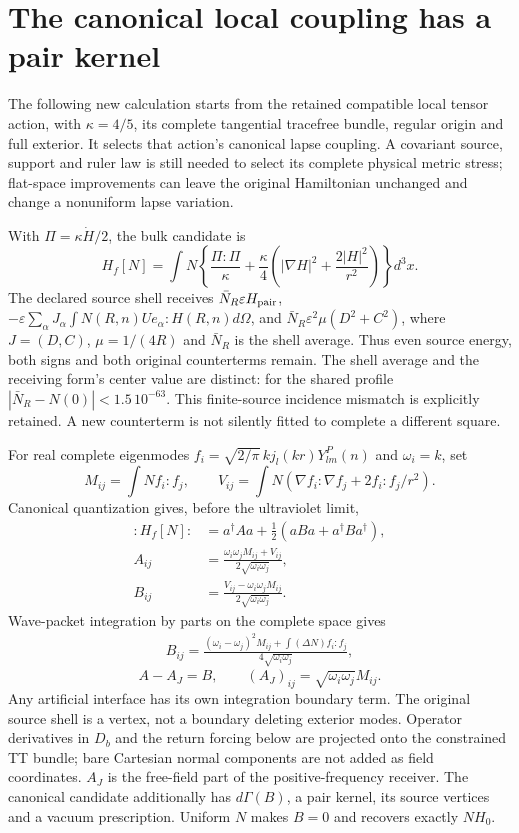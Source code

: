 \section{The canonical local coupling has a pair kernel}
The following new calculation starts from the retained compatible local
tensor action, with $\kappa=4/5$, its complete tangential tracefree bundle,
regular origin and full exterior.  It selects that action's canonical lapse
coupling.  A covariant source, support and ruler law is still needed to
select its complete physical metric stress; flat-space improvements can
leave the original Hamiltonian unchanged and change a nonuniform lapse
variation.

With $\Pi=\kappa\dot H/2$, the bulk candidate is
\[
 H_f[N]=\int N\left\{\frac{\Pi:\Pi}{\kappa}
 +\frac\kappa 4\left(|\nabla H|^2+\frac{2|H|^2}{r^2}\right)\right\}d^3x.
\]
The declared source shell receives $\bar N_R\varepsilon H_{\rm pair}$,
$-\varepsilon\sum_\alpha J_\alpha\int N(R,n)Ue_\alpha:H(R,n)d\Omega$,
and $\bar N_R\varepsilon^2\mu(D^2+C^2)$, where $J=(D,C)$,
$\mu=1/(4R)$ and $\bar N_R$ is the shell average.  Thus even source energy,
both signs and both original counterterms remain. The shell average and the receiving form's center value are distinct: for the shared profile $|\bar N_R-N(0)|<1.5\,10^{-63}$. This finite-source incidence mismatch is explicitly retained.  A new counterterm is
not silently fitted to complete a different square.

For real complete eigenmodes
$f_i=\sqrt{2/\pi}\,k j_l(kr)Y^P_{lm}(n)$ and $\omega_i=k$, set
\[
 M_{ij}=\int Nf_i:f_j,\qquad
 V_{ij}=\int N(\nabla f_i:\nabla f_j+2f_i:f_j/r^2).
\]
Canonical quantization gives, before the ultraviolet limit,
\begin{align*}
 :H_f[N]:&=a^\dagger A a+\tfrac 12(a B a+a^\dagger B a^\dagger),\\
 A_{ij}&=\frac{\omega_i\omega_jM_{ij}+V_{ij}}
                  {2\sqrt{\omega_i\omega_j}},\\
 B_{ij}&=\frac{V_{ij}-\omega_i\omega_jM_{ij}}
                  {2\sqrt{\omega_i\omega_j}}.
\end{align*}
Wave-packet integration by parts on the complete space gives
\[
 \begin{gathered}
 B_{ij}=\frac{(\omega_i-\omega_j)^2M_{ij}
              +\int(\Delta N)f_i:f_j}{4\sqrt{\omega_i\omega_j}},
 \end{gathered}
\]
\[
 A-A_J=B,\qquad (A_J)_{ij}=\sqrt{\omega_i\omega_j}M_{ij}.
\]
Any artificial interface has its own integration boundary term.  The
original source shell is a vertex, not a boundary deleting exterior modes.
Operator derivatives in $D_b$ and the return forcing below are projected
onto the constrained TT bundle; bare Cartesian normal components are not
added as field coordinates.
$A_J$ is the free-field part of the positive-frequency receiver.  The
canonical candidate additionally has $d\Gamma(B)$, a pair kernel, its
source vertices and a vacuum prescription.  Uniform $N$ makes $B=0$ and
recovers exactly $NH_0$.

